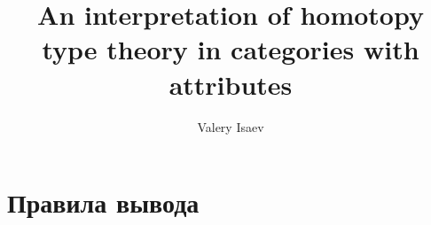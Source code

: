 \documentclass{amsart}
\theoremstyle{definition}
\theoremstyle{remark}
\newcommand{\red}{\Rightarrow}
\newcommand{\deq}{\Leftrightarrow}
\numberwithin{figure}{section}
\begin{document}
\title{An interpretation of homotopy type theory in categories with attributes}

\author{Valery Isaev}


\maketitle

\section{Правила вывода}

\begin{comment}
\begin{table}

\medskip
\begin{center}
\AxiomC{}
\UnaryInfC{$\vdash$}
\DisplayProof
\quad
\AxiomC{$\Gamma \vdash A$}
\RightLabel{, $x \notin \Gamma$}
\UnaryInfC{$\Gamma, x : A \vdash$}
\DisplayProof
\end{center}

\medskip
\begin{center}
\AxiomC{$\Gamma \vdash A$}
\RightLabel{, $x \notin \Gamma$}
\UnaryInfC{$\Gamma, x : A \vdash x : A$}
\DisplayProof
\quad
\AxiomC{$\Gamma \vdash x : A$}
\AxiomC{$\Gamma \vdash B$}
\RightLabel{, $y \notin \Gamma$}
\BinaryInfC{$\Gamma, y : B \vdash x : A$}
\DisplayProof
\end{center}

\medskip
\begin{center}
\AxiomC{$\Gamma \vdash a : A$}
\AxiomC{$\Gamma \vdash B$}
\RightLabel{, $A \deq B$}
\BinaryInfC{$\Gamma \vdash a : B$}
\DisplayProof
\end{center}

\medskip
\begin{center}
\AxiomC{$\Gamma \vdash A \red B$}
\UnaryInfC{$\Gamma \vdash A \deq B$}
\DisplayProof
\quad
\AxiomC{$\Gamma \vdash A \deq B$}
\UnaryInfC{$\Gamma \vdash B \deq A$}
\DisplayProof
\end{center}

\medskip
\begin{center}
\AxiomC{$\Gamma \vdash A \deq B$}
\AxiomC{$\Gamma \vdash B \deq C$}
\BinaryInfC{$\Gamma \vdash A \deq C$}
\DisplayProof
\end{center}

\medskip
\begin{center}
\AxiomC{$\Gamma \vdash a \red a' : A$}
\UnaryInfC{$\Gamma \vdash a \deq a' : A$}
\DisplayProof
\quad
\AxiomC{$\Gamma \vdash a \deq a' : A$}
\UnaryInfC{$\Gamma \vdash a' \deq a : A$}
\DisplayProof
\end{center}


\end{comment}
\end{document}
